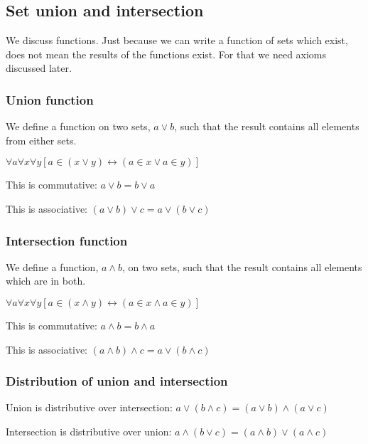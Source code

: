 
\subsection{Set union and intersection}

We discuss functions. Just because we can write a function of sets which exist, does not mean the results of the functions exist. For that we need axioms discussed later.

\subsubsection{Union function}

We define a function on two sets, \(a\lor b\), such that the result contains all elements from either sets.

$\forall a \forall x \forall y [a\in (x\lor y) \leftrightarrow (a\in x \lor a\in y)]$

This is commutative: \(a\lor b = b\lor a\)

This is associative: \((a\lor b)\lor c = a\lor (b\lor c)\)

\subsubsection{Intersection function}

We define a function, \(a\land b\), on two sets, such that the result contains all elements which are in both.

$\forall a \forall x \forall y [a\in (x\land y) \leftrightarrow (a\in x \land a\in y)]$

This is commutative: \(a\land b = b\land a\)

This is associative: \((a\land b)\land c = a\lor (b\land c)\)

\subsubsection{Distribution of union and intersection}

Union is distributive over intersection: \(a\lor (b\land c)=(a\lor b)\land (a\lor c)\)

Intersection is distributive over union: \(a\land (b\lor c)=(a\land b)\lor (a\land c)\)

